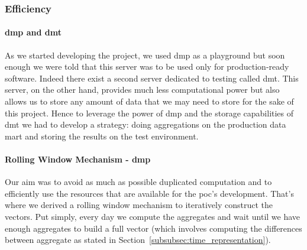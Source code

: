 \subsubsection{Efficiency}
\paragraph{\acrshort{dmp} and \acrshort{dmt}}
As we started developing the project, we used \acrfull{dmp} as a playground but soon enough we were told that this server was to be used only for production-ready software. Indeed there exist a second server dedicated to testing called \acrfull{dmt}. This server, on the other hand, provides much less computational power but also allows us to store any amount of data that we may need to store for the sake of this project. Hence to leverage the power of \acrshort{dmp} and the storage capabilities of \acrshort{dmt} we had to develop a strategy: doing aggregations on the production data mart and storing the results on the test environment.


\paragraph{Rolling Window Mechanism - \acrshort{dmp}}
Our aim was to avoid as much as possible duplicated computation and to efficiently use the resources that are available for the \acrshort{poc}'s development. That's where we derived a rolling window mechanism to iteratively construct the vectors. Put simply, every day we compute the aggregates and wait until we have enough aggregates to build a full vector (which involves computing the differences between aggregate as stated in Section~\ref{subsubsec:time_representation}). 

